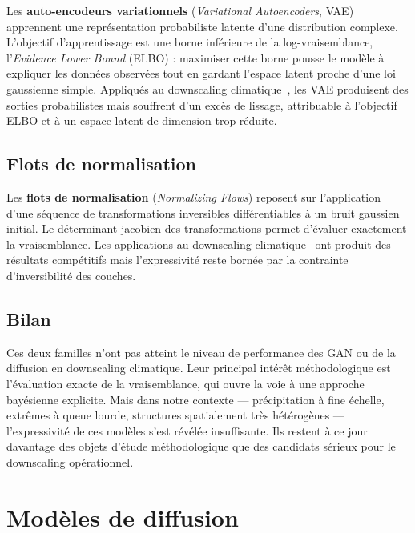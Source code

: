 \documentclass[14pt,a4paper,openany]{extreport}
\theoremstyle{definition}
\begin{document}
Les \textbf{auto-encodeurs variationnels} (\emph{Variational Autoencoders}, VAE)~\cite{kingma_vae_2014} apprennent une représentation probabiliste latente d'une distribution complexe. L'objectif d'apprentissage est une borne inférieure de la log-vraisemblance, l'\emph{Evidence Lower Bound} (ELBO) : maximiser cette borne pousse le modèle à expliquer les données observées tout en gardant l'espace latent proche d'une loi gaussienne simple. Appliqués au downscaling climatique~\cite{lange_vae_2022}, les VAE produisent des sorties probabilistes mais souffrent d'un excès de lissage, attribuable à l'objectif ELBO et à un espace latent de dimension trop réduite.

\subsection{Flots de normalisation}
\label{ssec:soa-flow}

Les \textbf{flots de normalisation} (\emph{Normalizing Flows}) reposent sur l'application d'une séquence de transformations inversibles différentiables à un bruit gaussien initial. Le déterminant jacobien des transformations permet d'évaluer exactement la vraisemblance. Les applications au downscaling climatique~\cite{groenke_flow_2020} ont produit des résultats compétitifs mais l'expressivité reste bornée par la contrainte d'inversibilité des couches.

\subsection{Bilan}
\label{ssec:soa-vrai-bilan}

Ces deux familles n'ont pas atteint le niveau de performance des GAN ou de la diffusion en downscaling climatique. Leur principal intérêt méthodologique est l'évaluation exacte de la vraisemblance, qui ouvre la voie à une approche bayésienne explicite. Mais dans notre contexte --- précipitation à fine échelle, extrêmes à queue lourde, structures spatialement très hétérogènes --- l'expressivité de ces modèles s'est révélée insuffisante. Ils restent à ce jour davantage des objets d'étude méthodologique que des candidats sérieux pour le downscaling opérationnel.

\section{Modèles de diffusion}
\label{sec:soa-diff}
\end{document}
